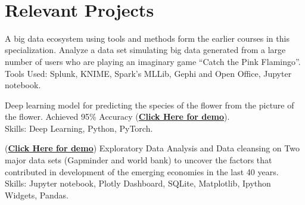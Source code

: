 \documentclass[letterpaper]{deedy-resume} %
\begin{document}
\begin{minipage}[t]{0.66\textwidth}
 \\

\sectionspace %

\section{Relevant Projects}

\vspace{\topsep} %
\begin{tightitemize}
\item A big data ecosystem using tools and methods form the earlier courses in this specialization. Analyze a data set simulating big data generated from a large number of users who are playing an imaginary game “Catch the Pink Flamingo”. \\ Tools Used: Splunk, KNIME, Spark's MLLib, Gephi and Open Office, Jupyter notebook.

\end{tightitemize}

\sectionspace %

\vspace{\topsep} %
\begin{tightitemize}
\item Deep learning model for predicting the species of the flower from the picture of the flower. Achieved 95\% Accuracy (\href{https://colab.research.google.com/github/hiteshsantwani/QPA/blob/master/Facebook_DeepLearningChallenge.ipynb}{\bf Click Here for demo}).\\ Skills: Deep Learning, Python, PyTorch.
\end{tightitemize}

\sectionspace %

\vspace{\topsep} %
\begin{tightitemize}
\item (\href{https://github.com/ubdsgroup/eas503projects/blob/master/Project2018/Group\%2015/Final\%20Report.pdf}{\bf Click Here for demo}) Exploratory Data Analysis and Data cleansing on Two major data sets (Gapminder and world bank) to uncover the factors that contributed in development of the emerging economies in the last 40 years. \\ Skills: Jupyter notebook, Plotly Dashboard, SQLite, Matplotlib, Ipython Widgets, Pandas.


\end{tightitemize}
\end{minipage}
\end{document}
